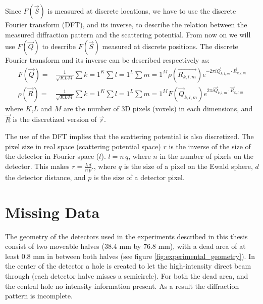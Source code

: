 Since $F(\vec{S})$ is measured at discrete locations, we have to use the discrete Fourier transform (DFT), and its inverse, to describe the relation between the measured diffraction pattern and the scattering potential. From now on we will use $F(\vec{Q})$ to describe $F(\vec{S})$ measured at discrete positions. The discrete Fourier transform and its inverse can be described respectively as: 
\begin{align}
F(\vec{Q}) =& \frac{1}{\sqrt{K L M}} \sum\limits{k=1}^{K} \sum\limits{l=1}^{L}\sum\limits{m=1}^{M} \rho(\vec{R_{k,l,m}}) e^{-2 \pi i \vec{Q}_{k,l,m}\cdot\vec{R}_{k,l,m}}\\
\rho(\vec{R}) =& \frac{1}{\sqrt{K L M}} \sum\limits{k=1}^{K} \sum\limits{l=1}^{L}\sum\limits{m=1}^{M} F(\vec{Q}_{k,l,m}) e^{2 \pi i \vec{Q}_{k,l,m}\cdot\vec{R}_{k,l,m}}
\end{align}
where $K$,$L$ and $M$ are the number of 3D pixels (voxels) in each dimensions, and $\vec{R}$ is the discretized version of $\vec{r}$. 

The use of the DFT implies that the scattering potential is also discretized. The pixel size in real space (scattering potential space) $r$ is the inverse of the size of the detector in Fourier space ($l$). $l = n\,q$, where $n$ in the number of pixels on the detector. This makes $r = \frac{\lambda\,d}{n\,p}$., where $q$ is the size of a pixel on the Ewald sphere, $d$ the detector distance, and $p$ is the size of a detector pixel.


\section{Missing Data}
The geometry of the detectors used in the experiments described in this thesis consist of two moveable halves (38.4 mm by 76.8 mm), with a dead area of at least 0.8 mm in between both halves (see figure \ref{fig:experimental_geometry}). In the center of the
detector a hole is created to let the high-intensity direct beam through (each detector halve misses a semicircle). For both the dead area, and the central hole no intensity information present. As a result the diffraction pattern is incomplete. 

